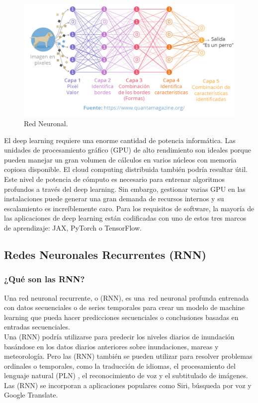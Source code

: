 \documentclass{article}
\begin{document}
\begin{figure}[H]
    \centering
    \includegraphics[scale=0.3]{layers.png}
    \caption{Red Neuronal.}
\end{figure}

El deep learning requiere una enorme cantidad de potencia informática. Las unidades de procesamiento gráfico (GPU) de alto rendimiento son ideales porque pueden manejar un gran volumen de cálculos en varios núcleos con memoria copiosa disponible. El cloud computing distribuida también podría resultar útil. Este nivel de potencia de cómputo es necesario para entrenar algoritmos profundos a través del deep learning. Sin embargo, gestionar varias GPU en las instalaciones puede generar una gran demanda de recursos internos y su escalamiento es increíblemente caro. Para los requisitos de software, la mayoría de las aplicaciones de deep learning están codificadas con uno de estos tres marcos de aprendizaje: JAX, PyTorch o TensorFlow. \\

\newpage

\subsection{Redes Neuronales Recurrentes (RNN)}
\subsubsection{¿Qué son las RNN?}
Una red neuronal recurrente, o (RNN), es una red neuronal \cite{ibm-nn} profunda entrenada con datos secuenciales o de series temporales para crear un modelo de machine learning \cite{ibm-ml} que pueda hacer predicciones secuenciales o conclusiones basadas en entradas secuenciales. \\

Una (RNN) podría utilizarse para predecir los niveles diarios de inundación basándose en los datos diarios anteriores sobre inundaciones, mareas y meteorología.
Pero las (RNN) también se pueden utilizar para resolver problemas ordinales o temporales, como la traducción de idiomas, el procesamiento del lenguaje natural (PLN) \cite{ibm-pln}, el reconocimiento de voz \cite{ibm-sr} y el subtitulado de imágenes.
Las (RNN) se incorporan a aplicaciones populares como Siri, búsqueda por voz y Google Translate.
\end{document}
